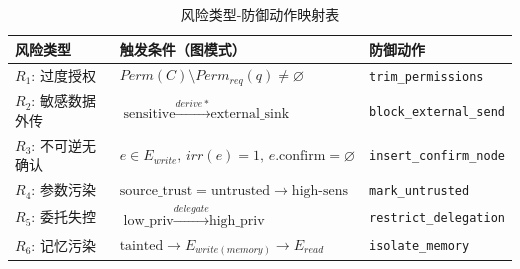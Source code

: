 \begin{table}[htbp]
\centering
\caption{风险类型-防御动作映射表}
\label{tab:defense_actions}
\small
\begin{tabular}{lll}
\toprule
\textbf{风险类型} & \textbf{触发条件（图模式）} & \textbf{防御动作} \\
\midrule
$R_1$: 过度授权 & $Perm(C) \setminus Perm_{req}(q) \neq \varnothing$ & \texttt{trim\_permissions} \\
$R_2$: 敏感数据外传 & $\text{sensitive} \xrightarrow{derive\ast} \text{external\_sink}$ & \texttt{block\_external\_send} \\
$R_3$: 不可逆无确认 & $e \in E_{write},\, irr(e)=1,\, e.\text{confirm}=\varnothing$ & \texttt{insert\_confirm\_node} \\
$R_4$: 参数污染 & $\text{source\_trust}=\text{untrusted} \rightarrow \text{high-sens}$ & \texttt{mark\_untrusted} \\
$R_5$: 委托失控 & $\text{low\_priv} \xrightarrow{delegate} \text{high\_priv}$ & \texttt{restrict\_delegation} \\
$R_6$: 记忆污染 & $\text{tainted} \rightarrow E_{write(memory)} \rightarrow E_{read}$ & \texttt{isolate\_memory} \\
\bottomrule
\end{tabular}
\end{table}